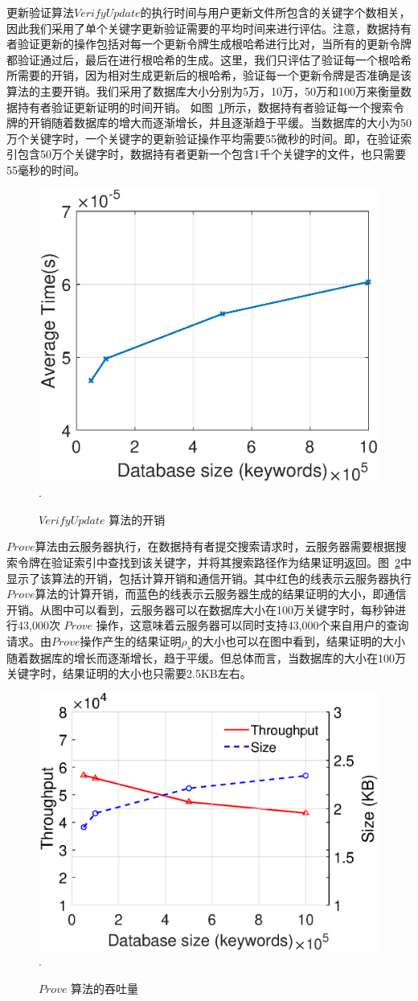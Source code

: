 更新验证算法$VerifyUpdate$的执行时间与用户更新文件所包含的关键字个数相关，因此我们采用了单个关键字更新验证需要的平均时间来进行评估。注意，数据持有者验证更新的操作包括对每一个更新令牌生成根哈希进行比对，当所有的更新令牌都验证通过后，最后在进行根哈希的生成。这里，我们只评估了验证每一个根哈希所需要的开销，因为相对生成更新后的根哈希，验证每一个更新令牌是否准确是该算法的主要开销。我们采用了数据库大小分别为5万，10万，50万和100万来衡量数据持有者验证更新证明的时间开销。 如图~\ref{fig:verifyupdate}所示，数据持有者验证每一个搜索令牌的开销随着数据库的增大而逐渐增长，并且逐渐趋于平缓。当数据库的大小为50万个关键字时，一个关键字的更新验证操作平均需要55微秒的时间。即，在验证索引包含50万个关键字时，数据持有者更新一个包含1千个关键字的文件，也只需要55毫秒的时间。
\begin{figure}[h]
\centering
\includegraphics[width=3.5 in]{expr/verifyupdate}
\DeclareGraphicsExtensions.
\caption{$VerifyUpdate$ 算法的开销}
\label{fig:verifyupdate}
\end{figure}


$Prove$算法由云服务器执行，在数据持有者提交搜索请求时，云服务器需要根据搜索令牌在验证索引中查找到该关键字，并将其搜索路径作为结果证明返回。图~\ref{fig:prove}中显示了该算法的开销，包括计算开销和通信开销。其中红色的线表示云服务器执行$Prove$算法的计算开销，而蓝色的线表示云服务器生成的结果证明的大小，即通信开销。从图中可以看到，云服务器可以在数据库大小在100万关键字时，每秒钟进行43,000次 $Prove$ 操作，这意味着云服务器可以同时支持43,000个来自用户的查询请求。由$Prove$操作产生的结果证明$\rho_s$的大小也可以在图中看到，结果证明的大小随着数据库的增长而逐渐增长，趋于平缓。但总体而言，当数据库的大小在100万关键字时，结果证明的大小也只需要2.5KB左右。
\begin{figure}[h]
\centering
\includegraphics[width=3.5 in]{expr/prove}
\DeclareGraphicsExtensions.
\caption{$Prove$ 算法的吞吐量}
\label{fig:prove}
\end{figure}

